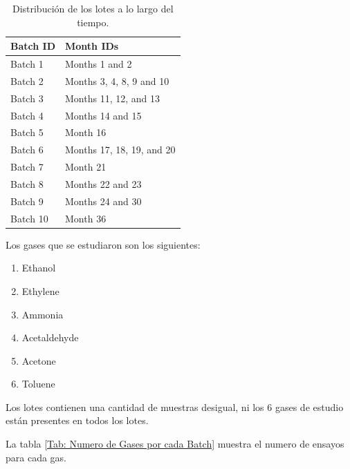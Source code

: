 \begin{table}[h!]
\begin{tabular}{|l|l|}
\hline
Batch ID & Month IDs                   \\ \hline
Batch 1  & Months 1 and 2              \\
Batch 2  & Months 3, 4, 8, 9 and 10    \\
Batch 3  & Months 11, 12, and 13       \\
Batch 4  & Months 14 and 15            \\
Batch 5  & Month 16                    \\
Batch 6  & Months 17, 18, 19, and 20   \\
Batch 7  & Month 21                    \\
Batch 8  & Months 22 and 23            \\
Batch 9  & Months 24 and 30            \\
Batch 10 & Month 36                    \\ \hline
\end{tabular}
    \caption{ Distribución de los lotes a lo largo del tiempo.}
\end{table}

Los gases que se estudiaron son los siguientes:
\begin{enumerate}
    \item Ethanol
    \item Ethylene
    \item Ammonia
    \item Acetaldehyde
    \item Acetone
    \item Toluene
\end{enumerate}

Los lotes contienen una cantidad de muestras desigual, ni los 6 gases de estudio están presentes en todos los lotes.

La tabla \ref{Tab: Numero de Gases por cada Batch} muestra el numero de ensayos para cada gas.

